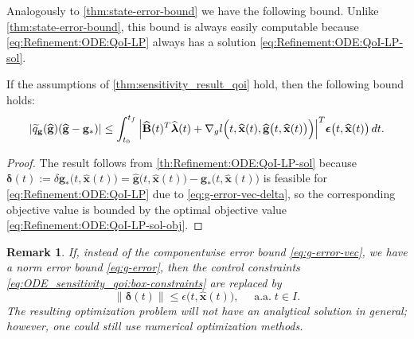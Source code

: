 \documentclass[onefignum,onetabnum]{siamart220329}
\numberwithin{equation}{section}
\newcommand{\aall}{\mbox{ a.a.} \;}
\newcommand{\bg}{\ensuremath{\mathbf{g}}} %
\newcommand{\bx}{\ensuremath{\mathbf{x}}} %
\newcommand {\bdelta} {\boldsymbol{\delta}}
\newcommand {\bepsilon} {\mbox{\boldmath $\epsilon$}}
\newcommand {\blambda} {\mbox{\boldmath $\lambda$}}
\newcommand{\BB}{\ensuremath{\mathbf{B}} } %
\newtheorem{remark}[theorem]{Remark}
\begin{document}
Analogously to \cref{thm:state-error-bound} we have the following bound. 
Unlike \cref{thm:state-error-bound}, this bound is always easily computable 
because \eqref{eq:Refinement:ODE:QoI-LP} always has a solution \eqref{eq:Refinement:ODE:QoI-LP-sol}.

\begin{theorem}   \label{thm:QoI-error-bound}
	If the assumptions of \cref{thm:sensitivity_result_qoi} hold, then the following bound holds:
     \[
         |    \widetilde{q}_\bg(\widehat{\bg}) ( \widehat{\bg} - \bg_* )  | 
         \le  \int_{t_0}^{t_f}  \Big|  \widehat{\BB}(t)^T \widehat{\blambda}(t) + \nabla_g l \Big( t, \widehat{\bx}(t), \widehat{\bg} \big( t, \widehat{\bx}(t) \big) \Big)  \Big|^T  \bepsilon\big( t, \widehat{\bx}(t) \big) \, dt.
     \]
\end{theorem}
\begin{proof}
    The result follows from \cref{th:Refinement:ODE:QoI-LP-sol}
    because
    $\bdelta(t) := \delta \bg_*\big(t, \widehat{\bx}(t)\big) = \widehat{\bg}\big(t, \widehat{\bx}(t)\big) - \bg_*\big(t, \widehat{\bx}(t)\big)$
    is feasible for \eqref{eq:Refinement:ODE:QoI-LP} due to \eqref{eq:g-error-vec-delta}, so the corresponding objective value is bounded by the optimal objective value \eqref{eq:Refinement:ODE:QoI-LP-sol-obj}.
\end{proof}

\begin{remark}   \label{rem:Refinement:ODE:control-constraints-norm-QoI}
     If,  instead of the   componentwise error bound \eqref{eq:g-error-vec}, we have
     a norm error bound \eqref{eq:g-error}, then the control constraints \eqref{eq:ODE_sensitivity_qoi:box-constraints}
     are replaced by
     \begin{equation*}
            \|   \bdelta( t )  \|  \leq  \epsilon\big( t, \widehat{\bx}(t) \big), \quad \aall t \in I.
     \end{equation*}
     The resulting optimization problem will not have an analytical solution in general; however, one
     could still use numerical optimization methods.
\end{remark}


% 
\end{document}
